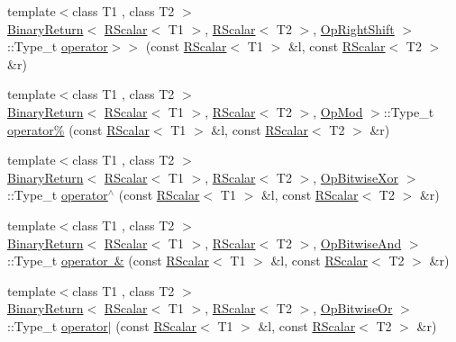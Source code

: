\begin{DoxyCompactItemize}
{\footnotesize template$<$class T1 , class T2 $>$ }\\\mbox{\hyperlink{structENSEM_1_1BinaryReturn}{Binary\+Return}}$<$ \mbox{\hyperlink{classENSEM_1_1RScalar}{R\+Scalar}}$<$ T1 $>$, \mbox{\hyperlink{classENSEM_1_1RScalar}{R\+Scalar}}$<$ T2 $>$, \mbox{\hyperlink{structENSEM_1_1OpRightShift}{Op\+Right\+Shift}} $>$\+::Type\+\_\+t \mbox{\hyperlink{group__rscalar_ga2b0d653b11b094308672a6a37a90d2c3}{operator$>$$>$}} (const \mbox{\hyperlink{classENSEM_1_1RScalar}{R\+Scalar}}$<$ T1 $>$ \&l, const \mbox{\hyperlink{classENSEM_1_1RScalar}{R\+Scalar}}$<$ T2 $>$ \&r)
\item 
{\footnotesize template$<$class T1 , class T2 $>$ }\\\mbox{\hyperlink{structENSEM_1_1BinaryReturn}{Binary\+Return}}$<$ \mbox{\hyperlink{classENSEM_1_1RScalar}{R\+Scalar}}$<$ T1 $>$, \mbox{\hyperlink{classENSEM_1_1RScalar}{R\+Scalar}}$<$ T2 $>$, \mbox{\hyperlink{structENSEM_1_1OpMod}{Op\+Mod}} $>$\+::Type\+\_\+t \mbox{\hyperlink{group__rscalar_ga98c5cade5781b5cdc4cbb1bb1d52739c}{operator\%}} (const \mbox{\hyperlink{classENSEM_1_1RScalar}{R\+Scalar}}$<$ T1 $>$ \&l, const \mbox{\hyperlink{classENSEM_1_1RScalar}{R\+Scalar}}$<$ T2 $>$ \&r)
\item 
{\footnotesize template$<$class T1 , class T2 $>$ }\\\mbox{\hyperlink{structENSEM_1_1BinaryReturn}{Binary\+Return}}$<$ \mbox{\hyperlink{classENSEM_1_1RScalar}{R\+Scalar}}$<$ T1 $>$, \mbox{\hyperlink{classENSEM_1_1RScalar}{R\+Scalar}}$<$ T2 $>$, \mbox{\hyperlink{structENSEM_1_1OpBitwiseXor}{Op\+Bitwise\+Xor}} $>$\+::Type\+\_\+t \mbox{\hyperlink{group__rscalar_gaded7a3a7e06c5438511a12e861cbd165}{operator$^\wedge$}} (const \mbox{\hyperlink{classENSEM_1_1RScalar}{R\+Scalar}}$<$ T1 $>$ \&l, const \mbox{\hyperlink{classENSEM_1_1RScalar}{R\+Scalar}}$<$ T2 $>$ \&r)
\item 
{\footnotesize template$<$class T1 , class T2 $>$ }\\\mbox{\hyperlink{structENSEM_1_1BinaryReturn}{Binary\+Return}}$<$ \mbox{\hyperlink{classENSEM_1_1RScalar}{R\+Scalar}}$<$ T1 $>$, \mbox{\hyperlink{classENSEM_1_1RScalar}{R\+Scalar}}$<$ T2 $>$, \mbox{\hyperlink{structENSEM_1_1OpBitwiseAnd}{Op\+Bitwise\+And}} $>$\+::Type\+\_\+t \mbox{\hyperlink{group__rscalar_ga389f96c37c3b933acfc68be93291ae0e}{operator \&}} (const \mbox{\hyperlink{classENSEM_1_1RScalar}{R\+Scalar}}$<$ T1 $>$ \&l, const \mbox{\hyperlink{classENSEM_1_1RScalar}{R\+Scalar}}$<$ T2 $>$ \&r)
\item 
{\footnotesize template$<$class T1 , class T2 $>$ }\\\mbox{\hyperlink{structENSEM_1_1BinaryReturn}{Binary\+Return}}$<$ \mbox{\hyperlink{classENSEM_1_1RScalar}{R\+Scalar}}$<$ T1 $>$, \mbox{\hyperlink{classENSEM_1_1RScalar}{R\+Scalar}}$<$ T2 $>$, \mbox{\hyperlink{structENSEM_1_1OpBitwiseOr}{Op\+Bitwise\+Or}} $>$\+::Type\+\_\+t \mbox{\hyperlink{group__rscalar_ga9e5397786fb0d112594a1fb887b1a58d}{operator$\vert$}} (const \mbox{\hyperlink{classENSEM_1_1RScalar}{R\+Scalar}}$<$ T1 $>$ \&l, const \mbox{\hyperlink{classENSEM_1_1RScalar}{R\+Scalar}}$<$ T2 $>$ \&r)

\end{DoxyCompactItemize}

